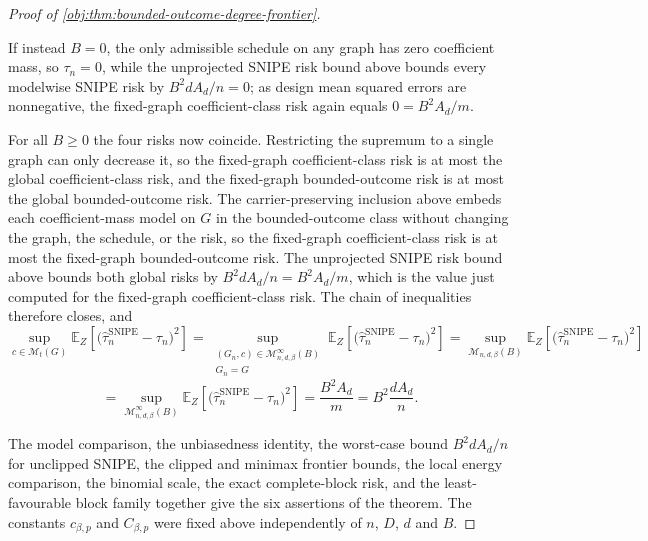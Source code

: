 \begin{proof}[Proof of \cref{obj:thm:bounded-outcome-degree-frontier}]
\begin{enumerate}
If instead \(B=0\), the only admissible schedule on any graph has zero
coefficient mass, so \(\tau_n=0\), while the unprojected SNIPE risk bound above
bounds every modelwise SNIPE risk
by \(B^2dA_d/n=0\); as design mean squared errors are nonnegative, the
fixed-graph coefficient-class risk again equals \(0=B^2A_d/m\).

For all \(B\ge0\) the four risks now coincide.  Restricting the supremum to a
single graph can only decrease it, so the fixed-graph coefficient-class risk is
at most the global coefficient-class risk, and the fixed-graph bounded-outcome
risk is at most the global bounded-outcome risk.  The carrier-preserving
inclusion above embeds each coefficient-mass model on \(G\) in the
bounded-outcome class without changing the graph, the schedule, or the risk, so
the fixed-graph coefficient-class risk is at most the fixed-graph
bounded-outcome risk.  The unprojected SNIPE risk bound above bounds both global
risks by
\(B^2dA_d/n=B^2A_d/m\), which is the value just computed for the fixed-graph
coefficient-class risk.  The chain of inequalities therefore closes, and
\[
\sup_{c\in\mathcal M_t(G)}
\mathbb E_Z\!\left[\bigl(\widehat\tau_n^{\mathrm{SNIPE}}-\tau_n\bigr)^2\right]
=
\sup_{\substack{(G_n,c)\in\mathcal M_{n,d,\beta}^{\infty}(B)\\ G_n=G}}
\mathbb E_Z\!\left[\bigl(\widehat\tau_n^{\mathrm{SNIPE}}-\tau_n\bigr)^2\right]
=
\sup_{\mathcal M_{n,d,\beta}(B)}
\mathbb E_Z\!\left[\bigl(\widehat\tau_n^{\mathrm{SNIPE}}-\tau_n\bigr)^2\right]
\]
\[
=
\sup_{\mathcal M_{n,d,\beta}^{\infty}(B)}
\mathbb E_Z\!\left[\bigl(\widehat\tau_n^{\mathrm{SNIPE}}-\tau_n\bigr)^2\right]
=
\frac{B^2A_d}{m}
=
B^2\frac{dA_d}{n}.
\]
\end{enumerate}
The model comparison, the unbiasedness identity, the worst-case bound
\(B^2dA_d/n\) for unclipped SNIPE, the clipped and minimax frontier bounds, the
local energy comparison, the binomial scale, the exact complete-block risk, and
the least-favourable block family together give the six assertions of the
theorem.  The constants \(c_{\beta,p}\) and \(C_{\beta,p}\) were fixed above
independently of \(n\), \(D\), \(d\) and \(B\).
\end{proof}

